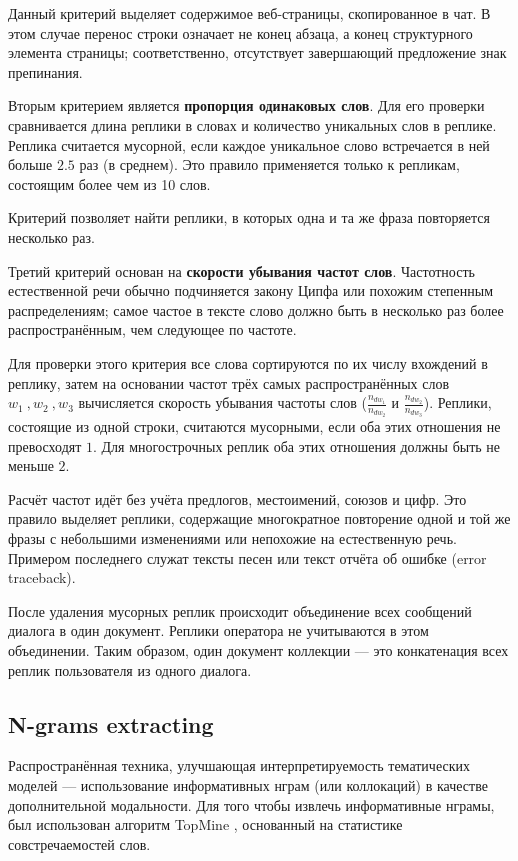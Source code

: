 Данный критерий выделяет содержимое веб-страницы, скопированное в чат. В этом случае перенос строки означает не конец абзаца, а конец структурного элемента страницы; соответственно, отсутствует завершающий предложение знак препинания.

Вторым критерием является \textbf{пропорция одинаковых слов}. Для его проверки сравнивается длина реплики в словах и количество уникальных слов в реплике. Реплика считается мусорной, если каждое уникальное слово встречается в ней больше $2.5$ раз (в среднем). Это правило применяется только к репликам, состоящим более чем из 10 слов.

Критерий позволяет найти реплики, в которых одна и та же фраза повторяется несколько раз.

Третий критерий основан на \textbf{скорости убывания частот слов}. Частотность естественной речи обычно подчиняется закону Ципфа или похожим степенным распределениям; самое частое в тексте слово должно быть в несколько раз более распространённым, чем следующее по частоте.

Для проверки этого критерия все слова сортируются по их числу вхождений в реплику, затем на основании частот трёх самых распространённых слов $w_1~,w_2~,w_3$ вычисляется скорость убывания частоты слов ($\frac{n_{d{w_1}}}{n_{dw_2}}$ и $\frac{n_{d{w_2}}}{n_{dw_3}}$). Реплики, состоящие из одной строки, считаются мусорными, если оба этих отношения не превосходят $1$. Для многострочных реплик оба этих отношения должны быть не меньше $2$.

Расчёт частот идёт без учёта предлогов, местоимений, союзов и цифр. Это правило выделяет реплики, содержащие многократное повторение одной и той же фразы с небольшими изменениями или непохожие на естественную речь. Примером последнего служат тексты песен или текст отчёта об ошибке (error traceback).

После удаления мусорных реплик происходит объединение всех сообщений диалога в один документ. Реплики оператора не учитываются в этом объединении. Таким образом, один документ коллекции --- это конкатенация всех реплик пользователя из одного диалога.

\subsection{N-grams extracting}

\par Распространённая техника, улучшающая интерпретируемость тематических моделей --- использование информативных нграм (или коллокаций) в качестве дополнительной модальности. Для того чтобы извлечь информативные нграмы, был использован алгоритм TopMine \cite{topmine}, основанный на статистике совстречаемостей слов.

